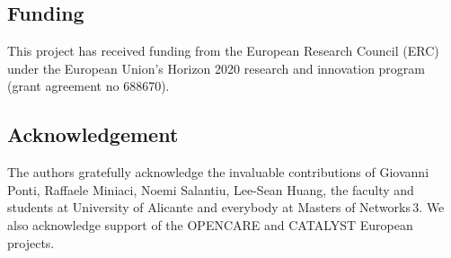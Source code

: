 \documentclass{bmcart}
\begin{document}
\begin{backmatter}
\subsection*{Funding}
This project has received funding from the European Research Council (ERC) under the European Union's Horizon 2020 research and innovation program (grant agreement no 688670).

\subsection*{Acknowledgement}
The authors gratefully acknowledge the invaluable contributions of Giovanni Ponti, Raffaele Miniaci, Noemi Salantiu, Lee-Sean Huang, the faculty and students at University of Alicante and everybody at Masters of Networks\,3. We also acknowledge support of the OPENCARE and CATALYST European projects.






\end{backmatter}
\end{document}
